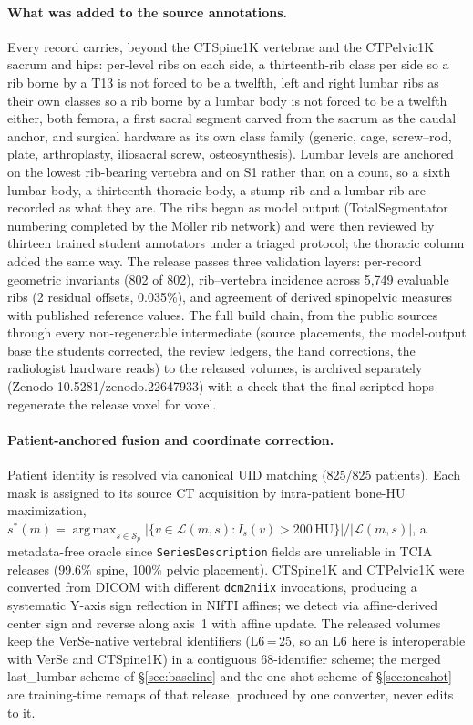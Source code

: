 \documentclass{article}
\DeclareMathOperator*{\argmax}{arg\,max}
\newcommand{\VerSe}{VerSe}
\begin{document}
\paragraph{What was added to the source annotations.}
Every record carries, beyond the CTSpine1K vertebrae and
the CTPelvic1K sacrum and hips: per-level ribs on each
side, a thirteenth-rib class per side so a rib borne by a
T13 is not forced to be a twelfth, left and right lumbar
ribs as their own classes so a rib borne by a lumbar body
is not forced to be a twelfth either, both femora, a first
sacral segment carved from the sacrum as the caudal anchor,
and surgical hardware as its own class family (generic,
cage, screw--rod, plate, arthroplasty, iliosacral screw,
osteosynthesis). Lumbar levels are anchored on the lowest
rib-bearing vertebra and on S1 rather than on a count, so
a sixth lumbar body, a thirteenth thoracic body, a stump
rib and a lumbar rib are recorded as what they are. The
ribs began as model output (TotalSegmentator numbering
completed by the M\"oller rib network) and were then
reviewed by thirteen trained student annotators under a
triaged protocol; the thoracic column added the same way.
The release passes three validation layers: per-record
geometric invariants (802 of 802), rib--vertebra incidence
across 5{,}749 evaluable ribs (2 residual offsets,
0.035\%), and agreement of derived spinopelvic measures
with published reference values. The full build chain,
from the public sources through every non-regenerable
intermediate (source placements, the model-output base the
students corrected, the review ledgers, the hand
corrections, the radiologist hardware reads) to the
released volumes, is archived separately
(Zenodo 10.5281/zenodo.22647933) with a check that the
final scripted hops regenerate the release voxel for voxel.

\paragraph{Patient-anchored fusion and coordinate
correction.} Patient identity is resolved via canonical UID
matching (825/825 patients). Each mask is assigned to its
source CT acquisition by intra-patient bone-HU
maximization,
$s^*(m) = \argmax_{s \in \mathcal{S}_p}
|\{v \in \mathcal{L}(m, s) : I_s(v) > 200\,\text{HU}\}|/|\mathcal{L}(m, s)|$,
a metadata-free oracle since \texttt{SeriesDescription}
fields are unreliable in TCIA releases (99.6\% spine,
100\% pelvic placement). CTSpine1K and CTPelvic1K were
converted from DICOM with different \texttt{dcm2niix}
invocations, producing a systematic Y-axis sign reflection
in NIfTI affines; we detect via affine-derived center sign
and reverse along axis~1 with affine update. The
released volumes keep the \VerSe{}-native vertebral
identifiers (L6\,=\,25, so an L6 here is interoperable with
\VerSe{} and CTSpine1K) in a contiguous 68-identifier
scheme; the merged last\_lumbar scheme of
\S\ref{sec:baseline} and the one-shot scheme of
\S\ref{sec:oneshot} are training-time remaps of that
release, produced by one converter, never edits to it.
\end{document}
